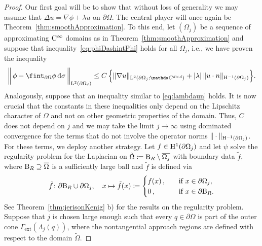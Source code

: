 \begin{proof}
  
  Our first goal will be to show that without loss of generality we may assume that $\Delta u = \nabla \phi + \lambda u$ on $\partial\Omega$.
  The central player will once again be Theorem~\ref{thm:smoothApproximation}.
  To this end, let $(\Omega_j)$ be a sequence of approximating $\mathrm{C}^\infty$ domains as in Theorem~\ref{thm:smoothApproximation} and suppose that inequality~\eqref{eq:phiDashintPhi} holds for all $\Omega_j$, i.e., we have proven the inequality
  \begin{align*}
    \bigg\|\, \phi - \fint_{\partial\Omega} \phi \d\sigma  \, \bigg\|_{\Ell^2(\partial\Omega_j)}
     \leq C\, \Big\{ \|\nabla u\|_{\Ell^2(\partial\Omega_j; \C^{d\times d})} + |\lambda| \, \|u\cdot n\|_{\HH^{-1}(\partial\Omega_j)} \Big\}.
  \end{align*}
  Analogously, suppose that an inequality similar to \eqref{eq:lambdaun} holds.
  It is now crucial that the constants in these inequalities only depend on the Lipschitz character of $\Omega$ and not on other geometric properties of the domain.
  Thus, $C$ does not depend on $j$ and we may take the limit $j \to \infty$ using dominated convergence for the terms that do not involve the operator norms $\| \cdot \|_{\mathrm{H}^{-1}(\partial\Omega_j)}$. 
  For these terms, we deploy another strategy.
  Let $f \in \mathrm{H}^1(\partial\Omega_j)$ and let $\psi$ solve the regularity problem for the Laplacian on $\tilde \Omega \coloneqq \mathrm{B}_R \setminus \overline{\Omega_j}$ with boundary data $\tilde f$, where $\mathrm{B}_R \supseteq \overline\Omega$ is a sufficiently large ball and $\tilde f$ is defined via
  \begin{align*}
    \tilde f \colon \partial\mathrm{B}_R \cup \partial\Omega_j ,
    \quad x \mapsto \tilde f(x) \coloneqq 
    \begin{cases}
      f(x)\,, &\quad\text{if } x \in \partial\Omega_j, \\
      0\,, &\quad\text{if } x \in \partial\mathrm{B}_R.
    \end{cases}
  \end{align*}
  See Theorem~\ref{thm:jerisonKenig} b) for the results on the regularity problem.
  Suppose that $j$ is chosen large enough such that every $q \in \partial\Omega$ is part of the outer cone $\Gamma_{\text{ext}}(\Lambda_j(q))$, where the nontangential approach regions are defined with respect to the domain $\tilde\Omega$. 

\end{proof}
